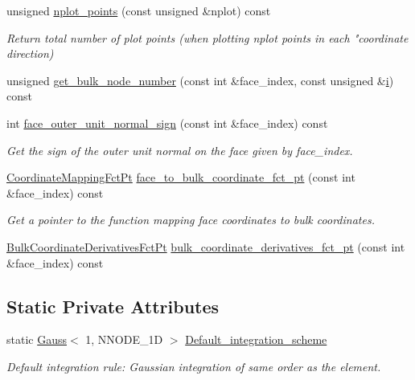 \begin{DoxyCompactItemize}
unsigned \hyperlink{classoomph_1_1QElement_3_011_00_01NNODE__1D_01_4_ae0c506f7c36b9b667d4058bf9eaa11f7}{nplot\+\_\+points} (const unsigned \&nplot) const
\begin{DoxyCompactList}\small\item\em Return total number of plot points (when plotting nplot points in each "coordinate direction) \end{DoxyCompactList}\item 
unsigned \hyperlink{classoomph_1_1QElement_3_011_00_01NNODE__1D_01_4_a5a12cf6e4a14744a76662acfca274bdb}{get\+\_\+bulk\+\_\+node\+\_\+number} (const int \&face\+\_\+index, const unsigned \&\hyperlink{cfortran_8h_adb50e893b86b3e55e751a42eab3cba82}{i}) const
\item 
int \hyperlink{classoomph_1_1QElement_3_011_00_01NNODE__1D_01_4_ae4e942432e60479d8c6acbc5a25e7c36}{face\+\_\+outer\+\_\+unit\+\_\+normal\+\_\+sign} (const int \&face\+\_\+index) const
\begin{DoxyCompactList}\small\item\em Get the sign of the outer unit normal on the face given by face\+\_\+index. \end{DoxyCompactList}\item 
\hyperlink{namespaceoomph_afa5c7a93cae1917e874b392601be0bde}{Coordinate\+Mapping\+Fct\+Pt} \hyperlink{classoomph_1_1QElement_3_011_00_01NNODE__1D_01_4_a9bb6add7472a726643f28ab984f5b961}{face\+\_\+to\+\_\+bulk\+\_\+coordinate\+\_\+fct\+\_\+pt} (const int \&face\+\_\+index) const
\begin{DoxyCompactList}\small\item\em Get a pointer to the function mapping face coordinates to bulk coordinates. \end{DoxyCompactList}\item 
\hyperlink{namespaceoomph_a0a75fbfa1139f00cf88adeee835c8fe5}{Bulk\+Coordinate\+Derivatives\+Fct\+Pt} \hyperlink{classoomph_1_1QElement_3_011_00_01NNODE__1D_01_4_a2802d39509c1638f639fa825f8b0996e}{bulk\+\_\+coordinate\+\_\+derivatives\+\_\+fct\+\_\+pt} (const int \&face\+\_\+index) const
\end{DoxyCompactItemize}
\subsection*{Static Private Attributes}
\begin{DoxyCompactItemize}
\item 
static \hyperlink{classoomph_1_1Gauss}{Gauss}$<$ 1, N\+N\+O\+D\+E\+\_\+1D $>$ \hyperlink{classoomph_1_1QElement_3_011_00_01NNODE__1D_01_4_a885bd236427af390a48d346e01eeb469}{Default\+\_\+integration\+\_\+scheme}
\begin{DoxyCompactList}\small\item\em Default integration rule\+: Gaussian integration of same \textquotesingle{}order\textquotesingle{} as the element. \end{DoxyCompactList}\end{DoxyCompactItemize}
